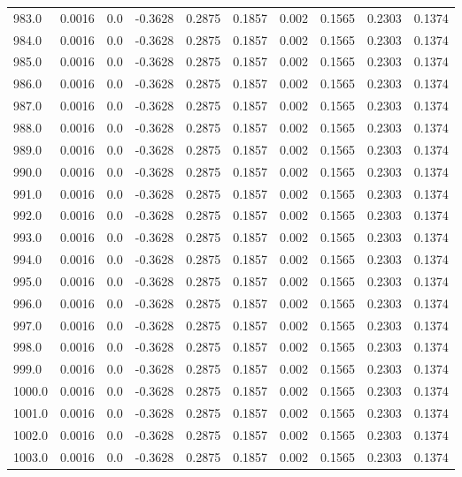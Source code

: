 \begin{longtable}{lrrrrrrrrr}
983.0 & 0.0016 & 0.0 & -0.3628 & 0.2875 & 0.1857 & 0.002 & 0.1565 & 0.2303 & 0.1374 \\
984.0 & 0.0016 & 0.0 & -0.3628 & 0.2875 & 0.1857 & 0.002 & 0.1565 & 0.2303 & 0.1374 \\
985.0 & 0.0016 & 0.0 & -0.3628 & 0.2875 & 0.1857 & 0.002 & 0.1565 & 0.2303 & 0.1374 \\
986.0 & 0.0016 & 0.0 & -0.3628 & 0.2875 & 0.1857 & 0.002 & 0.1565 & 0.2303 & 0.1374 \\
987.0 & 0.0016 & 0.0 & -0.3628 & 0.2875 & 0.1857 & 0.002 & 0.1565 & 0.2303 & 0.1374 \\
988.0 & 0.0016 & 0.0 & -0.3628 & 0.2875 & 0.1857 & 0.002 & 0.1565 & 0.2303 & 0.1374 \\
989.0 & 0.0016 & 0.0 & -0.3628 & 0.2875 & 0.1857 & 0.002 & 0.1565 & 0.2303 & 0.1374 \\
990.0 & 0.0016 & 0.0 & -0.3628 & 0.2875 & 0.1857 & 0.002 & 0.1565 & 0.2303 & 0.1374 \\
991.0 & 0.0016 & 0.0 & -0.3628 & 0.2875 & 0.1857 & 0.002 & 0.1565 & 0.2303 & 0.1374 \\
992.0 & 0.0016 & 0.0 & -0.3628 & 0.2875 & 0.1857 & 0.002 & 0.1565 & 0.2303 & 0.1374 \\
993.0 & 0.0016 & 0.0 & -0.3628 & 0.2875 & 0.1857 & 0.002 & 0.1565 & 0.2303 & 0.1374 \\
994.0 & 0.0016 & 0.0 & -0.3628 & 0.2875 & 0.1857 & 0.002 & 0.1565 & 0.2303 & 0.1374 \\
995.0 & 0.0016 & 0.0 & -0.3628 & 0.2875 & 0.1857 & 0.002 & 0.1565 & 0.2303 & 0.1374 \\
996.0 & 0.0016 & 0.0 & -0.3628 & 0.2875 & 0.1857 & 0.002 & 0.1565 & 0.2303 & 0.1374 \\
997.0 & 0.0016 & 0.0 & -0.3628 & 0.2875 & 0.1857 & 0.002 & 0.1565 & 0.2303 & 0.1374 \\
998.0 & 0.0016 & 0.0 & -0.3628 & 0.2875 & 0.1857 & 0.002 & 0.1565 & 0.2303 & 0.1374 \\
999.0 & 0.0016 & 0.0 & -0.3628 & 0.2875 & 0.1857 & 0.002 & 0.1565 & 0.2303 & 0.1374 \\
1000.0 & 0.0016 & 0.0 & -0.3628 & 0.2875 & 0.1857 & 0.002 & 0.1565 & 0.2303 & 0.1374 \\
1001.0 & 0.0016 & 0.0 & -0.3628 & 0.2875 & 0.1857 & 0.002 & 0.1565 & 0.2303 & 0.1374 \\
1002.0 & 0.0016 & 0.0 & -0.3628 & 0.2875 & 0.1857 & 0.002 & 0.1565 & 0.2303 & 0.1374 \\
1003.0 & 0.0016 & 0.0 & -0.3628 & 0.2875 & 0.1857 & 0.002 & 0.1565 & 0.2303 & 0.1374 \\

\end{longtable}
